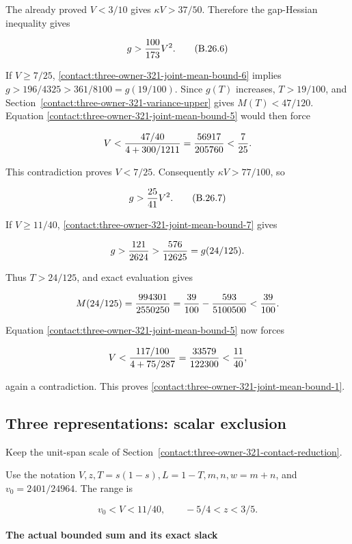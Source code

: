 The already proved $V<3/10$ gives $\kappa V>37/50$. Therefore the
gap-Hessian inequality gives

\[
 g>{100\over173}V^2.
\tag{B.26.6}\label{contact:three-owner-321-joint-mean-bound-6}
\]

If $V\ge 7/25$, \eqref{contact:three-owner-321-joint-mean-bound-6} implies
$g>196/4325>361/8100=g(19/100)$. Since $g(T)$ increases, $T>19/100$,
and Section~\ref{contact:three-owner-321-variance-upper} gives $M(T)<47/120$. Equation \eqref{contact:three-owner-321-joint-mean-bound-5} would then force

\[
 V<{47/40\over4+300/1211}
 ={56917\over205760}<{7\over25}.
\]

This contradiction proves $V<7/25$. Consequently $\kappa V>77/100$, so

\[
 g>{25\over41}V^2.
\tag{B.26.7}\label{contact:three-owner-321-joint-mean-bound-7}
\]

If $V\ge 11/40$, \eqref{contact:three-owner-321-joint-mean-bound-7} gives

\[
 g>{121\over2624}>{576\over12625}=g(24/125).
\]

Thus $T>24/125$, and exact evaluation gives

\[
 M(24/125)={994301\over2550250}
 ={39\over100}-{593\over5100500}<{39\over100}.
\]

Equation \eqref{contact:three-owner-321-joint-mean-bound-5} now forces

\[
 V<{117/100\over4+75/287}
 ={33579\over122300}<{11\over40},
\]

again a contradiction. This proves \eqref{contact:three-owner-321-joint-mean-bound-1}.
\subsection{Three representations: scalar exclusion}\label{contact:three-owner-321-scalar-closure}
Keep the unit-span scale of Section~\ref{contact:three-owner-321-contact-reduction}.



Use the notation $V,z,T=s(1-s),L=1-T,m,n,w=m+n$, and
$v_0=2401/24964$. The range is

\[
 v_0<V<11/40,\qquad -5/4<z<3/5.
\tag{B.27.1}\label{contact:three-owner-321-scalar-closure-1}
\]

\paragraph{The actual bounded sum and its exact slack}

